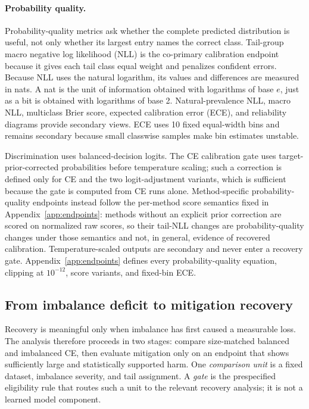 \documentclass[11pt]{article}
\begin{document}
\paragraph{Probability quality.}
Probability-quality metrics ask whether the complete predicted distribution is useful, not only whether its largest entry names the correct class. Tail-group macro negative log likelihood (NLL) is the co-primary calibration endpoint because it gives each tail class equal weight and penalizes confident errors. Because NLL uses the natural logarithm, its values and differences are measured in nats. A nat is the unit of information obtained with logarithms of base $e$, just as a bit is obtained with logarithms of base 2. Natural-prevalence NLL, macro NLL, multiclass Brier score, expected calibration error (ECE), and reliability diagrams provide secondary views. ECE uses 10 fixed equal-width bins and remains secondary because small classwise samples make bin estimates unstable.

Discrimination uses balanced-decision logits. The CE calibration gate uses target-prior-corrected probabilities before temperature scaling; such a correction is defined only for CE and the two logit-adjustment variants, which is sufficient because the gate is computed from CE runs alone. Method-specific probability-quality endpoints instead follow the per-method score semantics fixed in Appendix~\ref{app:endpoints}: methods without an explicit prior correction are scored on normalized raw scores, so their tail-NLL changes are probability-quality changes under those semantics and not, in general, evidence of recovered calibration. Temperature-scaled outputs are secondary and never enter a recovery gate. Appendix~\ref{app:endpoints} defines every probability-quality equation, clipping at $10^{-12}$, score variants, and fixed-bin ECE.

\subsection{From imbalance deficit to mitigation recovery}
\label{sec:recovery}
Recovery is meaningful only when imbalance has first caused a measurable loss. The analysis therefore proceeds in two stages: compare size-matched balanced and imbalanced CE, then evaluate mitigation only on an endpoint that shows sufficiently large and statistically supported harm. One \emph{comparison unit} is a fixed dataset, imbalance severity, and tail assignment. A \emph{gate} is the prespecified eligibility rule that routes such a unit to the relevant recovery analysis; it is not a learned model component.
\end{document}
